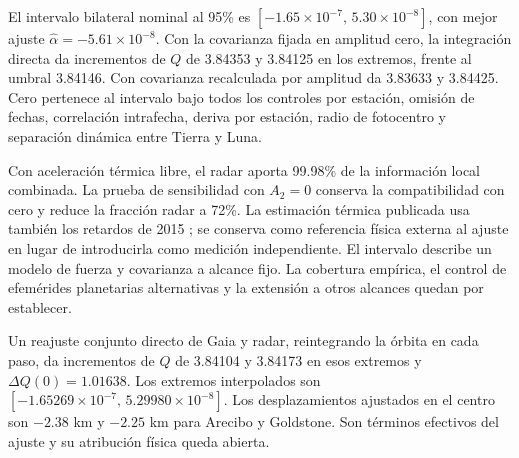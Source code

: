 \documentclass[11pt,a4paper]{article}
\begin{document}
El intervalo bilateral nominal al 95\% es $[-1.65\times10^{-7},\,5.30\times10^{-8}]$, con mejor ajuste $\hat\alpha=-5.61\times10^{-8}$. Con la covarianza fijada en amplitud cero, la integración directa da incrementos de $Q$ de 3.84353 y 3.84125 en los extremos, frente al umbral 3.84146. Con covarianza recalculada por amplitud da 3.83633 y 3.84425. Cero pertenece al intervalo bajo todos los controles por estación, omisión de fechas, correlación intrafecha, deriva por estación, radio de fotocentro y separación dinámica entre Tierra y Luna.

Con aceleración térmica libre, el radar aporta 99.98\% de la información local combinada. La prueba de sensibilidad con $A_2=0$ conserva la compatibilidad con cero y reduce la fracción radar a 72\%. La estimación térmica publicada usa también los retardos de 2015 \cite{icarusradar}; se conserva como referencia física externa al ajuste en lugar de introducirla como medición independiente. El intervalo describe un modelo de fuerza y covarianza a alcance fijo. La cobertura empírica, el control de efemérides planetarias alternativas y la extensión a otros alcances quedan por establecer.

Un reajuste conjunto directo de Gaia y radar, reintegrando la órbita en cada paso, da incrementos de $Q$ de 3.84104 y 3.84173 en esos extremos y $\Delta Q(0)=1.01638$. Los extremos interpolados son $[-1.65269\times10^{-7},\,5.29980\times10^{-8}]$. Los desplazamientos ajustados en el centro son $-2.38$ km y $-2.25$ km para Arecibo y Goldstone. Son términos efectivos del ajuste y su atribución física queda abierta.
\end{document}
